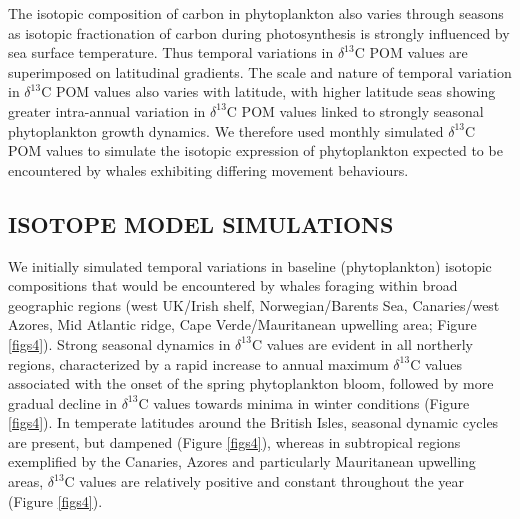 \documentclass[a4paper,12pt]{article}
\begin{document}
The isotopic composition of carbon in phytoplankton also varies through seasons as isotopic fractionation of carbon during photosynthesis is strongly influenced by sea surface temperature\cite{laws1995dependence}. 
Thus temporal variations in $\delta^{13}$C POM values are superimposed on latitudinal gradients. 
The scale and nature of temporal variation in $\delta^{13}$C POM values also varies with latitude, with higher latitude seas showing greater intra-annual variation in $\delta^{13}$C POM values linked to strongly seasonal phytoplankton growth dynamics. 
We therefore used monthly simulated $\delta^{13}$C POM values to simulate the isotopic expression of phytoplankton expected to be encountered by whales exhibiting differing movement behaviours.
 
\subsection*{ISOTOPE MODEL SIMULATIONS}
We initially simulated temporal variations in baseline (phytoplankton) isotopic compositions that would be encountered by whales foraging within broad geographic regions (west UK/Irish shelf, Norwegian/Barents Sea, Canaries/west Azores, Mid Atlantic ridge, Cape Verde/Mauritanean upwelling area; Figure \ref{figs4}). 
Strong seasonal dynamics in $\delta^{13}$C values are evident in all northerly regions, characterized by a rapid increase to annual maximum $\delta^{13}$C values associated with the onset of the spring phytoplankton bloom, followed by more gradual decline in $\delta^{13}$C values towards minima in winter conditions (Figure \ref{figs4}). 
In temperate latitudes around the British Isles, seasonal dynamic cycles are present, but dampened (Figure \ref{figs4}), whereas in subtropical regions exemplified by the Canaries, Azores and particularly Mauritanean upwelling areas, $\delta^{13}$C values are relatively positive and constant throughout the year (Figure \ref{figs4}).
 
\end{document}
